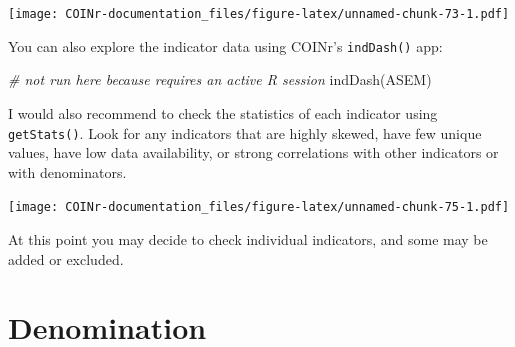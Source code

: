 \documentclass[
]{book}
\newenvironment{Shaded}{\begin{snugshade}}{\end{snugshade}}
\newcommand{\AttributeTok}[1]{\textcolor[rgb]{0.77,0.63,0.00}{#1}}
\newcommand{\CommentTok}[1]{\textcolor[rgb]{0.56,0.35,0.01}{\textit{#1}}}
\newcommand{\DocumentationTok}[1]{\textcolor[rgb]{0.56,0.35,0.01}{\textbf{\textit{#1}}}}
\newcommand{\FunctionTok}[1]{\textcolor[rgb]{0.00,0.00,0.00}{#1}}
\newcommand{\NormalTok}[1]{#1}
\newcommand{\OtherTok}[1]{\textcolor[rgb]{0.56,0.35,0.01}{#1}}
\newcommand{\SpecialCharTok}[1]{\textcolor[rgb]{0.00,0.00,0.00}{#1}}
\newcommand{\StringTok}[1]{\textcolor[rgb]{0.31,0.60,0.02}{#1}}
\begin{document}
\texttt{[image: COINr-documentation\_files/figure-latex/unnamed-chunk-73-1.pdf]}

You can also explore the indicator data using COINr's \texttt{indDash()} app:

\begin{Shaded}
\begin{Highlighting}[]
\CommentTok{\# not run here because requires an active R session}
\FunctionTok{indDash}\NormalTok{(ASEM)}
\end{Highlighting}
\end{Shaded}

I would also recommend to check the statistics of each indicator using \texttt{getStats()}. Look for any indicators that are highly skewed, have few unique values, have low data availability, or strong correlations with other indicators or with denominators.

\begin{Shaded}
\end{Shaded}

\texttt{[image: COINr-documentation\_files/figure-latex/unnamed-chunk-75-1.pdf]}

At this point you may decide to check individual indicators, and some may be added or excluded.

\hypertarget{denomination-1}{%
\section{Denomination}\label{denomination-1}}
\end{document}

